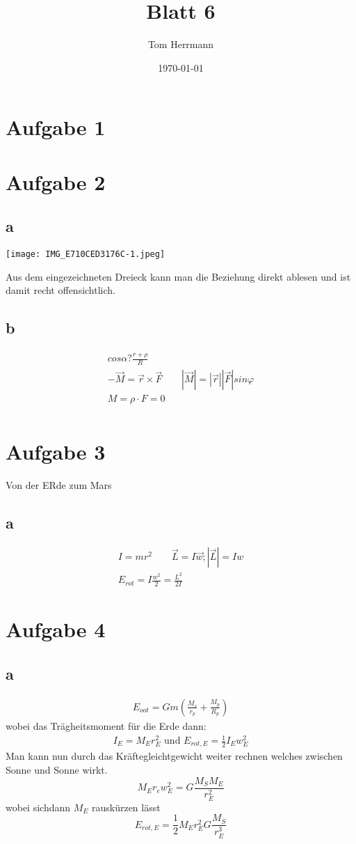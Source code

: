 \documentclass[11pt]{article}
\title{Blatt 6} %
\begin{document}
\lstset{language=Java}
\author{Tom Herrmann}
\date{\today}
\maketitle
\section{Aufgabe 1}
\section{Aufgabe 2}
\subsection{a}
\begin{center}
	\texttt{[image: IMG\_E710CED3176C-1.jpeg]}
\end{center}
Aus dem eingezeichneten Dreieck kann man die Beziehung direkt ablesen und ist damit recht offensichtlich.
\subsection{b}
\begin{align*}
	cos \alpha ? \frac{r + \rho}{R}\\
	-\vec{M} = \vec{r} \times \vec{F} \qquad |\vec{M}| = |\vec{r}| |\vec{F}| sin \varphi\\
	M = \rho \cdot F = 0\\
\end{align*}
\section{Aufgabe 3 }
	Von der ERde zum Mars
	\subsection{a}
		\begin{align*}
			I = mr^2 \qquad \vec{L} = I \vec{w}; |\vec{L}| = Iw\\
			E_{rot}= I \frac{w^2}{2} = \frac{L^2}{2I}
		\end{align*}
\section{Aufgabe 4}
	\subsection{a}
		\begin{align*}
			E_{oot} = Gm\left( \frac{M_s}{r_p} + \frac{M_p}{R_p} \right)
		\end{align*}
		wobei das Trägheitsmoment für die Erde dann:
		\begin{align*}
			I_E = M_E r_E^2 \text{ und } E_{rot, E} = \frac{1}{2} I_E w_E^2
		\end{align*}
Man kann nun durch das Kräftegleichtgewicht weiter rechnen welches zwischen Sonne und Sonne wirkt.
	 \[M_E r_e w_E^2 = G \frac{M_S M_E}{r_E^2}\]
	wobei sichdann $M_E$ rauskürzen lässt
	\[E_{rot,E} = \frac{1}{2} M_{E} r_{E}^2 G \frac{M_S}{r_{E}^3}\]
\end{document}
